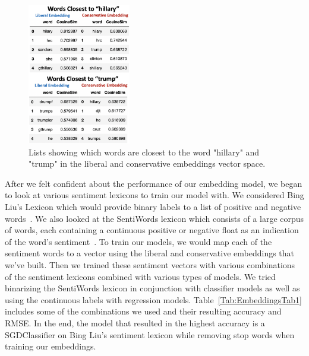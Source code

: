 \documentclass[conference]{IEEEtran}
\begin{document}
\begin{figure}[tb]
    \centering
    \includegraphics[width=0.4\textwidth]{Embeddings1.pdf}
    \vspace{-2mm}
    \caption{Lists showing which words are closest to the word "hillary" and "trump" in the liberal and conservative embeddings vector space.}
    \label{fig:Embeddings1}
    \vspace{-5mm}
\end{figure}
 
After we felt confident about the performance of our embedding model, we began to look at various sentiment lexicons to train our model with. We considered Bing Liu's Lexicon which would provide binary labels to a list of positive and negative words~\cite{hu2004mining}. We also looked at the SentiWords lexicon which consists of a large corpus of words, each containing a continuous positive or negative float as an indication of the word's sentiment~\cite{baccianella2010sentiwordnet}. To train our models, we would map each of the sentiment words to a vector using the liberal and conservative embeddings that we've built. Then we trained these sentiment vectors with various combinations of the sentiment lexicons combined with various types of models. We tried binarizing the SentiWords lexicon in conjunction with classifier models as well as using the continuous labels with regression models. Table~\ref{Tab:EmbeddingsTab1} includes some of the combinations we used and their resulting accuracy and RMSE. In the end, the model that resulted in the highest accuracy is a SGDClassifier on Bing Liu's sentiment lexicon while removing stop words when training our embeddings.
\end{document}
